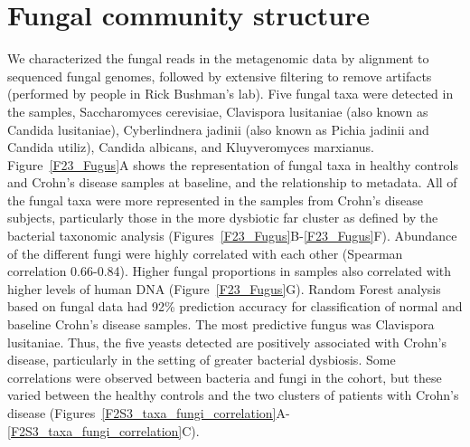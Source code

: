 \section{Fungal community structure} 
We characterized the fungal reads in the metagenomic data by alignment to sequenced fungal genomes, followed by extensive filtering to remove artifacts (performed by people in Rick Bushman's lab). Five fungal taxa were detected in the samples, Saccharomyces cerevisiae, Clavispora lusitaniae (also known as Candida lusitaniae), Cyberlindnera jadinii (also known as Pichia jadinii and Candida utiliz), Candida albicans, and Kluyveromyces marxianus. Figure~\ref{F23_Fugus}A shows the representation of fungal taxa in healthy controls and Crohn's disease samples at baseline, and the relationship to metadata. All of the fungal taxa were more represented in the samples from Crohn's disease subjects, particularly those in the more dysbiotic far cluster as defined by the bacterial taxonomic analysis (Figures~\ref{F23_Fugus}B-\ref{F23_Fugus}F). Abundance of the different fungi were highly correlated with each other (Spearman correlation 0.66-0.84). Higher fungal proportions in samples also correlated with higher levels of human DNA (Figure~\ref{F23_Fugus}G). Random Forest analysis based on fungal data had 92\% prediction accuracy for classification of normal and baseline Crohn's disease samples. The most predictive fungus was Clavispora lusitaniae. Thus, the five yeasts detected are positively associated with Crohn's disease, particularly in the setting of greater bacterial dysbiosis. Some correlations were observed between bacteria and fungi in the cohort, but these varied between the healthy controls and the two clusters of patients with Crohn's disease (Figures~\ref{F2S3_taxa_fungi_correlation}A-\ref{F2S3_taxa_fungi_correlation}C).


